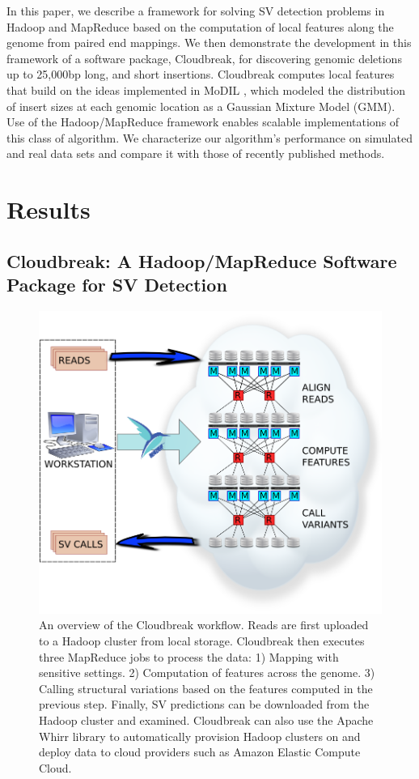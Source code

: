 \documentclass[11pt]{article}
\begin{document}
In this paper, we describe a framework for solving SV detection problems in Hadoop and MapReduce based on the computation of local features along the genome from paired end mappings. We then demonstrate the development in this framework of a software package, Cloudbreak, for discovering genomic deletions up to 25,000bp long, and short insertions. Cloudbreak computes local features that build on the ideas implemented in MoDIL \autocite{Lee:2009da}, which modeled the distribution of insert sizes at each genomic location as a Gaussian Mixture Model (GMM). Use of the Hadoop/MapReduce framework enables scalable implementations of this class of algorithm. We characterize our algorithm's performance on simulated and real data sets and compare it with those of recently published methods.

\section{Results}

\subsection{Cloudbreak: A Hadoop/MapReduce Software Package for SV Detection}

\begin{figure}
\centering
\includegraphics[width=.8\textwidth]{../figures/workflow_with_whirr.png}
\caption{An overview of the Cloudbreak workflow. Reads are first uploaded to a Hadoop cluster from local storage. Cloudbreak then executes three MapReduce jobs to process the data: 1) Mapping with sensitive settings. 2) Computation of features across the genome. 3) Calling structural variations based on the features computed in the previous step. Finally, SV predictions can be downloaded from the Hadoop cluster and examined. Cloudbreak can also use the Apache Whirr library to automatically provision Hadoop clusters on and deploy data to cloud providers such as Amazon Elastic Compute Cloud.}
\label{cloudbreak_workflow}
\end{figure}
\end{document}
